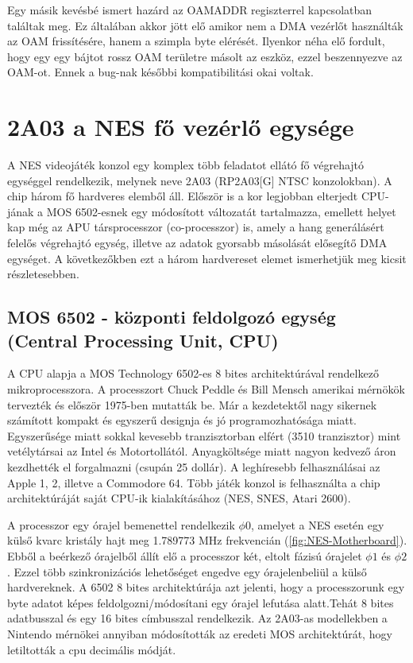  	 Egy másik kevésbé ismert hazárd az OAMADDR regiszterrel kapcsolatban találtak meg. Ez általában akkor jött elő amikor nem a DMA vezérlőt használták az OAM frissítésére, hanem a szimpla byte elérését. Ilyenkor néha elő fordult, hogy egy egy bájtot rossz OAM területre másolt az eszköz, ezzel beszennyezve az OAM-ot. Ennek a bug-nak későbbi kompatibilitási okai voltak.    
 	 
 	       
\section{2A03 a NES fő vezérlő egysége}

A NES videojáték konzol egy komplex több feladatot ellátó fő végrehajtó egységgel rendelkezik, melynek neve 2A03 (RP2A03[G] NTSC konzolokban). A chip három fő hardveres elemből áll. Először is a kor legjobban elterjedt CPU-jának a MOS 6502-esnek egy módosított változatát tartalmazza, emellett helyet kap még az APU társprocesszor (co-processzor) is, amely a hang generálásért felelős végrehajtó egység, illetve az adatok gyorsabb másolását elősegítő DMA egységet. A következőkben ezt a három hardvereset elemet ismerhetjük meg kicsit részletesebben.

	\subsection{MOS 6502 - központi feldolgozó egység (Central Processing Unit, CPU)}
	
	A CPU alapja a MOS Technology 6502-es 8 bites architektúrával rendelkező mikroprocesszora. A processzort Chuck Peddle és Bill Mensch amerikai mérnökök tervezték és először 1975-ben mutatták be. Már a kezdetektől nagy sikernek számított kompakt és egyszerű designja és jó programozhatósága miatt. Egyszerűsége miatt sokkal kevesebb tranzisztorban elfért (3510 tranzisztor) mint vetélytársai az Intel és Motortollától. Anyagköltsége miatt nagyon kedvező áron kezdhették el forgalmazni (csupán 25 dollár). A leghíresebb felhasználásai az Apple 1, 2, illetve a Commodore 64. Több játék konzol is felhasználta a chip architektúráját saját CPU-ik kialakításához (NES, SNES, Atari 2600). 
	
	A processzor egy órajel bemenettel rendelkezik $\phi0$, amelyet a NES esetén egy külső kvarc kristály hajt meg 1.789773 MHz frekvencián (\ref{fig:NES-Motherboard}). Ebből a beérkező órajelből állít elő a processzor két, eltolt fázisú órajelet $\phi1$ és $\phi2$. Ezzel több szinkronizációs lehetőséget engedve egy órajelenbeliül a külső hardvereknek. A 6502 8 bites architektúrája azt jelenti, hogy a processzorunk egy byte adatot képes feldolgozni/módosítani egy órajel lefutása alatt.Tehát 8 bites adatbusszal és egy 16 bites címbusszal rendelkezik. Az 2A03-as modellekben a Nintendo mérnökei annyiban módosították az eredeti MOS architektúrát, hogy letiltották a cpu decimális módját.

